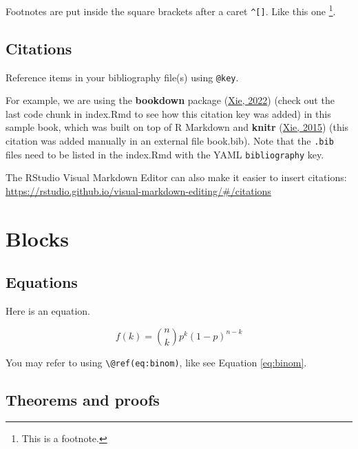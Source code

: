 \documentclass[
  12pt,
  twoside]{book}
\theoremstyle{definition}
\theoremstyle{definition}
\theoremstyle{definition}
\theoremstyle{definition}
\theoremstyle{remark}
\begin{document}
Footnotes are put inside the square brackets after a caret \texttt{\^{}{[}{]}}. Like this one \footnote{This is a footnote.}.

\hypertarget{citations}{%
\section{Citations}\label{citations}}

Reference items in your bibliography file(s) using \texttt{@key}.

For example, we are using the \textbf{bookdown} package (\protect\hyperlink{ref-R-bookdown}{Xie, 2022}) (check out the last code chunk in index.Rmd to see how this citation key was added) in this sample book, which was built on top of R Markdown and \textbf{knitr} (\protect\hyperlink{ref-xie2015}{Xie, 2015}) (this citation was added manually in an external file book.bib).
Note that the \texttt{.bib} files need to be listed in the index.Rmd with the YAML \texttt{bibliography} key.

The RStudio Visual Markdown Editor can also make it easier to insert citations: \url{https://rstudio.github.io/visual-markdown-editing/\#/citations}

\hypertarget{blocks}{%
\chapter*{Blocks}\label{blocks}}

\hypertarget{equations}{%
\section{Equations}\label{equations}}

Here is an equation. 

\begin{equation} 
  f\left(k\right) = \binom{n}{k} p^k\left(1-p\right)^{n-k}
  \label{eq:binom}
\end{equation}

You may refer to using \texttt{\textbackslash{}@ref(eq:binom)}, like see Equation \eqref{eq:binom}.

\hypertarget{theorems-and-proofs}{%
\section{Theorems and proofs}\label{theorems-and-proofs}}
\end{document}
